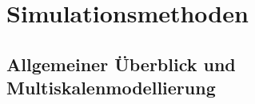 \chapter{Simulationsmethoden}
\label{cha:simulationsmethoden}

\section{Allgemeiner Überblick und Multiskalenmodellierung}
\label{allgemeinerueberblickundmultiskalenmodellierung}